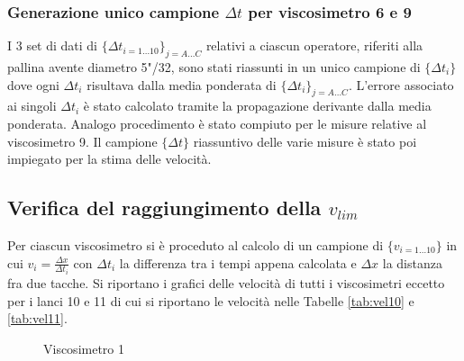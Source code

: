 \documentclass[a4paper,11pt,oneside]{article}
\begin{document}
\subsubsection*{Generazione unico campione $\Delta t$ per viscosimetro 6 e 9}
I 3 set di dati di $\{\Delta t_{i=1\dots10}\}_{j=A \dots C}$ relativi a ciascun operatore, riferiti alla pallina avente diametro 5"/32, sono stati riassunti in un unico campione di $\{\Delta t_{i}\}$ dove ogni $\Delta t_{i}$ risultava dalla media ponderata di $\{\Delta t_{i}\}_{j=A \dots C}$. L'errore associato ai singoli ${\Delta t_{i}}$ è stato calcolato tramite la propagazione derivante dalla media ponderata.\newline
Analogo procedimento è stato compiuto per le misure relative al viscosimetro 9.
Il campione $\{\Delta t\}$ riassuntivo delle varie misure è stato poi impiegato per la stima delle velocità.


\subsection{Verifica del raggiungimento della $v_{lim}$}

Per ciascun viscosimetro si è proceduto al calcolo di un campione di $\{v_{i=1\dots 10}\}$ in cui $v_{i} = \frac{\Delta x}{\Delta t_i}$ con $\Delta t_i$ la differenza tra i tempi appena calcolata e $\Delta x$ la distanza fra due tacche. Si riportano i grafici delle velocità di tutti i viscosimetri eccetto per i lanci 10 e 11 di cui si riportano le velocità nelle Tabelle \ref{tab:vel10} e \ref{tab:vel11}.\\

\begin{figure}[h!]
    \centering
    \caption{Viscosimetro 1}
\end{figure}
\end{document}
